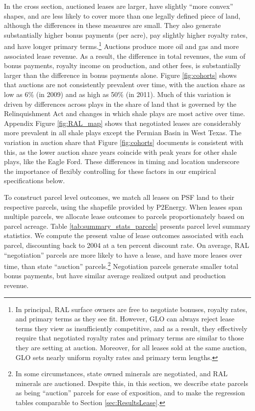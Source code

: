 In the cross section, auctioned leases are larger, have slightly ``more convex'' shapes, and are less likely to cover more than one legally defined piece of land, although the differences in these measures are small. They also generate substantially higher bonus payments (per acre), pay slightly higher royalty rates, and have longer primary terms.\footnote{In principal, RAL surface owners are free to negotiate bonuses, royalty rates, and primary terms as they see fit.  However, GLO can always reject lease terms they view as insufficiently competitive, and as a result, they effectively require that negotiated royalty rates and primary terms are similar to those they are setting at auction.  Moreover, for all leases sold at the same auction, GLO sets nearly uniform royalty rates and primary term lengths.} Auctions produce more oil and gas and more associated lease revenue.  As a result, the difference in total revenues, the sum of bonus payments, royalty income on production, and other fees, is substantially larger than the difference in bonus payments alone.  Figure \ref{fig:cohorts} shows that auctions are not consistently prevalent over time, with the auction share as low as 6\% (in 2009) and as high as 50\% (in 2011).  Much of this variation is driven by differences across plays in the share of land that is governed by the Relinquishment Act and changes in which shale plays are most active over time.  Appendix Figure \ref{fig:RAL_map} shows that negotiated leases are considerably more prevalent in all shale plays except the Permian Basin in West Texas.  The variation in auction share that Figure \ref{fig:cohorts} documents is consistent with this, as the lower auction share years coincide with peak years for other shale plays, like the Eagle Ford.  These differences in timing and location underscore the importance of flexibly controlling for these factors in our empirical specifications below. 

To construct parcel level outcomes, we match all leases on PSF land to their respective parcels, using the shapefile provided by P2Energy. When leases span multiple parcels, we allocate lease outcomes to parcels proportionately based on parcel acreage.  Table \ref{tab:summary_stats_parcels} presents parcel level summary statistics. We compute the present value of lease outcomes associated with each parcel, discounting back to 2004 at a ten percent discount rate. On average, RAL ``negotiation'' parcels are more likely to have a lease, and have more leases over time, than state ``auction'' parcels.\footnote{In some circumstances, state owned minerals are negotiated, and RAL minerals are auctioned. Despite this, in this section, we describe state parcels as being ``auction'' parcels for ease of exposition, and to make the regression tables comparable to Section \ref{sec:ResultsLease}.} Negotiation parcels generate smaller total bonus payments, but have similar average realized output and production revenue. 


